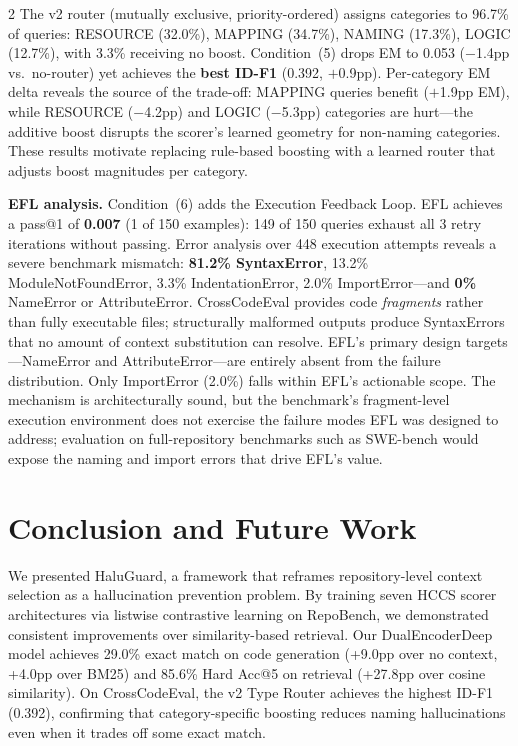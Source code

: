 \documentclass[11pt,a4paper]{article}
\begin{document}
\begin{multicols}{2}
The v2 router (mutually exclusive, priority-ordered) assigns categories to 96.7\% of queries: RESOURCE (32.0\%), MAPPING (34.7\%), NAMING (17.3\%), LOGIC (12.7\%), with 3.3\% receiving no boost. Condition~(5) drops EM to 0.053 ($-$1.4pp vs.\ no-router) yet achieves the \textbf{best ID-F1} (0.392, $+$0.9pp). Per-category EM delta reveals the source of the trade-off: MAPPING queries benefit ($+$1.9pp EM), while RESOURCE ($-$4.2pp) and LOGIC ($-$5.3pp) categories are hurt---the additive boost disrupts the scorer's learned geometry for non-naming categories. These results motivate replacing rule-based boosting with a learned router that adjusts boost magnitudes per category.

\noindent\textbf{EFL analysis.} Condition~(6) adds the Execution Feedback Loop. EFL achieves a pass@1 of \textbf{0.007} (1 of 150 examples): 149 of 150 queries exhaust all 3 retry iterations without passing. Error analysis over 448 execution attempts reveals a severe benchmark mismatch: \textbf{81.2\% SyntaxError}, 13.2\% ModuleNotFoundError, 3.3\% IndentationError, 2.0\% ImportError---and \textbf{0\%} NameError or AttributeError. CrossCodeEval provides code \textit{fragments} rather than fully executable files; structurally malformed outputs produce SyntaxErrors that no amount of context substitution can resolve. EFL's primary design targets---NameError and AttributeError---are entirely absent from the failure distribution. Only ImportError (2.0\%) falls within EFL's actionable scope. The mechanism is architecturally sound, but the benchmark's fragment-level execution environment does not exercise the failure modes EFL was designed to address; evaluation on full-repository benchmarks such as SWE-bench would expose the naming and import errors that drive EFL's value.

\section{Conclusion and Future Work}

We presented HaluGuard, a framework that reframes repository-level context selection as a hallucination prevention problem. By training seven HCCS scorer architectures via listwise contrastive learning on RepoBench, we demonstrated consistent improvements over similarity-based retrieval. Our DualEncoderDeep model achieves 29.0\% exact match on code generation (+9.0pp over no context, +4.0pp over BM25) and 85.6\% Hard Acc@5 on retrieval (+27.8pp over cosine similarity). On CrossCodeEval, the v2 Type Router achieves the highest ID-F1 (0.392), confirming that category-specific boosting reduces naming hallucinations even when it trades off some exact match.


\end{multicols}
\end{document}
